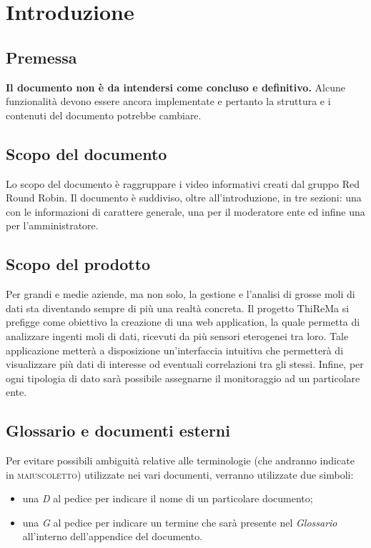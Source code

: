\section{Introduzione}
	\subsection{Premessa}
		\textbf{Il documento non è da intendersi come concluso e definitivo.} Alcune funzionalità devono essere ancora implementate e pertanto la struttura e i contenuti del documento potrebbe cambiare.
	\subsection{Scopo del documento}
		Lo scopo del documento è raggruppare i video informativi creati dal gruppo Red Round Robin. Il documento è suddiviso, oltre all'introduzione, in tre sezioni: una con le informazioni di carattere generale, una per il moderatore ente ed infine una per l'amministratore.	
	\subsection{Scopo del prodotto}
		Per grandi e medie aziende, ma non solo, la gestione e l'analisi di grosse moli di dati sta diventando sempre di più una realtà concreta.
	 	\newline
		Il progetto ThiReMa si prefigge come obiettivo la creazione di una web application, la quale permetta di analizzare ingenti moli di dati, ricevuti da più sensori eterogenei tra loro. Tale applicazione metterà a disposizione un'interfaccia intuitiva che permetterà di visualizzare più dati di interesse od eventuali correlazioni tra gli stessi. Infine, per ogni tipologia di dato sarà possibile assegnarne il monitoraggio ad un particolare ente.	
	\subsection{Glossario e documenti esterni}
		Per evitare possibili ambiguità relative alle terminologie (che andranno indicate in \textsc{maiuscoletto}) utilizzate nei vari documenti, verranno utilizzate due simboli:
		\begin{itemize}
			\item una \textit{D} al pedice per indicare il nome di un particolare documento;
			\item una \textit{G} al pedice per indicare un termine che sarà presente nel \textit{Glossario} all'interno dell'appendice del documento.
		\end{itemize}
	